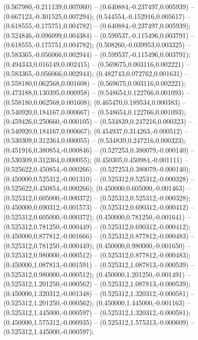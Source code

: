  (0.567980,-0.211139,0.007060) -- (0.640884,-0.237497,0.005939) -- (0.667123,-0.301525,0.007294);
 (0.544554,-0.152916,0.005617) -- (0.618555,-0.175751,0.004782) -- (0.640884,-0.237497,0.005939);
 (0.524846,-0.096099,0.004384) -- (0.599537,-0.115496,0.003791) -- (0.618555,-0.175751,0.004782);
 (0.508260,-0.039953,0.003325) -- (0.583365,-0.056066,0.002944) -- (0.599537,-0.115496,0.003791);
 (0.494343,0.016149,0.002415) -- (0.569675,0.003116,0.002221) -- (0.583365,-0.056066,0.002944);
 (0.482743,0.072762,0.001631) -- (0.558180,0.062568,0.001608) -- (0.569675,0.003116,0.002221);
 (0.473188,0.130395,0.000958) -- (0.548654,0.122766,0.001093) -- (0.558180,0.062568,0.001608);
 (0.465470,0.189534,0.000383) -- (0.540920,0.184167,0.000667) -- (0.548654,0.122766,0.001093);
 (0.459426,0.250660,-0.000105) -- (0.534839,0.247216,0.000323) -- (0.540920,0.184167,0.000667);
 (0.454937,0.314263,-0.000512) -- (0.530309,0.312364,0.000055) -- (0.534839,0.247216,0.000323);
 (0.451916,0.380854,-0.000846) -- (0.527253,0.380079,-0.000140) -- (0.530309,0.312364,0.000055);
 (0.450305,0.450984,-0.001111) -- (0.525622,0.450854,-0.000266) -- (0.527253,0.380079,-0.000140);
 (0.450000,0.525312,-0.001310) -- (0.525312,0.525312,-0.000328) -- (0.525622,0.450854,-0.000266);
 (0.450000,0.605000,-0.001463) -- (0.525312,0.605000,-0.000372) -- (0.525312,0.525312,-0.000328);
 (0.450000,0.690312,-0.001573) -- (0.525312,0.690312,-0.000412) -- (0.525312,0.605000,-0.000372);
 (0.450000,0.781250,-0.001641) -- (0.525312,0.781250,-0.000449) -- (0.525312,0.690312,-0.000412);
 (0.450000,0.877812,-0.001666) -- (0.525312,0.877812,-0.000483) -- (0.525312,0.781250,-0.000449);
 (0.450000,0.980000,-0.001650) -- (0.525312,0.980000,-0.000512) -- (0.525312,0.877812,-0.000483);
 (0.450000,1.087813,-0.001591) -- (0.525312,1.087813,-0.000539) -- (0.525312,0.980000,-0.000512);
 (0.450000,1.201250,-0.001491) -- (0.525312,1.201250,-0.000562) -- (0.525312,1.087813,-0.000539);
 (0.450000,1.320312,-0.001348) -- (0.525312,1.320312,-0.000581) -- (0.525312,1.201250,-0.000562);
 (0.450000,1.445000,-0.001163) -- (0.525312,1.445000,-0.000597) -- (0.525312,1.320312,-0.000581);
 (0.450000,1.575312,-0.000935) -- (0.525312,1.575313,-0.000609) -- (0.525312,1.445000,-0.000597);
